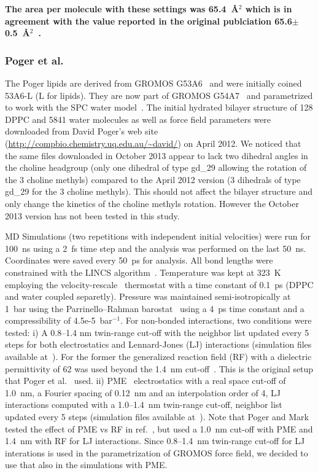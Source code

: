 \documentclass[pre,aps,floatfix,authordate1-4,twocolumn]{revtex4-1}
\begin{document}
{\bf The area per molecule with these settings was 65.4~\AA$^2$ which is in agreement with the value reported in the original publciation 65.6$\pm$0.5~\AA$^2$~\cite{dickson14}.}

\subsubsection{Poger et al.}
The Poger lipids are derived from GROMOS G53A6~\cite{poger10} and were initially coined 53A6-L (L for lipids). They are now part of GROMOS G54A7~\cite{poger12} 
and parametrized to work with the SPC water model~\cite{berendsen81}. The initial hydrated bilayer structure of 128 DPPC and 5841 water molecules as well as force field parameters were downloaded 
from David Poger's web site (\url{http://compbio.chemistry.uq.edu.au/~david/}) on April 2012. 
We noticed that the same files downloaded in October 2013 appear to lack two dihedral angles in the choline headgroup (only one dihedral of type gd\_29 allowing 
the rotation of the 3 choline methyls) compared to the April 2012 version (3 dihedrals of type gd\_29 for the 3 choline methyls). This should not affect the 
bilayer structure and only change the kinetics of the choline methyls rotation. However the October 2013 version has not been tested in this study.

MD Simulations (two repetitions with independent initial velocities) were run for 100~ns using a 2~fs time step and the analysis 
was performed on the last 50~ns. Coordinates were saved every 50~ps for analysis. All bond lengths were constrained with the LINCS algorithm~\cite{hess97,hess07}. Temperature was kept 
at 323~K employing the velocity-rescale~\cite{bussi07} thermostat with a time constant of 0.1~ps (DPPC and water coupled separetly). Pressure was maintained semi-isotropically at 1~bar using 
the Parrinello--Rahman barostat~\cite{parrinello81} using a 4~ps time constant and a compressibility of 4.5e-5~bar$^{-1}$. For non-bonded interactions, two conditions were tested:
i) A 0.8--1.4 nm twin-range cut-off with the neighbor list updated every 5 steps for both electrostatics and Lennard-Jones (LJ) interactions 
(simulation files available at~\cite{pogerFILESrf1,pogerFILESrf2}). For the former the generalized reaction 
field (RF) with a dielectric permittivity of 62 was used beyond the 1.4~nm cut-off~\cite{tironi95}. This is the original setup that Poger et al.~\cite{poger10} used.
ii) PME~\cite{darden93,essman95} electrostatics with a real space cut-off of 1.0~nm, a Fourier spacing of 0.12~nm and an interpolation order of 4, LJ interactions computed with a 1.0--1.4~nm twin-range cut-off,
neighbor list updated every 5 steps (simulation files available at~\cite{pogerFILESpme1,pogerFILESpme2}). 
Note that Poger and Mark tested the effect of PME vs RF in ref.~\cite{poger12}, but used a 1.0~nm cut-off with PME and 1.4~nm with RF for LJ
interactions. Since 0.8--1.4~nm twin-range cut-off for LJ interations is used in the parametrization of GROMOS force field, we decided to use that
also in the simulations with PME.
\end{document}
